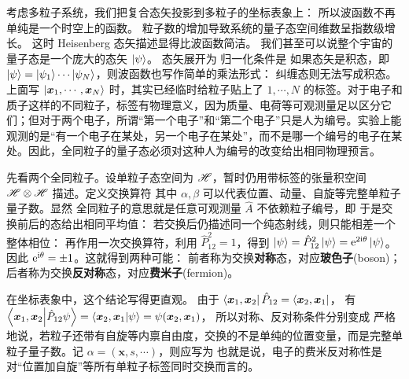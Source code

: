 考虑多粒子系统，我们把复合态矢投影到多粒子的坐标表象上：
所以波函数不再单纯是一个时空上的函数。
粒子数的增加导致系统的量子态空间维数呈指数级增长。
这时 Heisenberg 态矢描述显得比波函数简洁。
我们甚至可以说整个宇宙的量子态是一个庞大的态矢 $\ket{\psi}$。
态矢展开为
归一化条件是
如果态矢是积态，即 $\ket{\psi}=\ket{\psi_1}\cdots\ket{\psi_N}$，则波函数也写作简单的乘法形式：
纠缠态则无法写成积态。
上面写 $\ket{\bm x_1,\cdots,\bm x_N}$ 时，其实已经临时给粒子贴上了 $1,\cdots,N$ 的标签。对于电子和质子这样的不同粒子，标签有物理意义，因为质量、电荷等可观测量足以区分它们；但对于两个电子，所谓“第一个电子”和“第二个电子”只是人为编号。实验上能观测的是“有一个电子在某处，另一个电子在某处”，而不是哪一个编号的电子在某处。因此，全同粒子的量子态必须对这种人为编号的改变给出相同物理预言。

先看两个全同粒子。设单粒子态空间为 $\mathscr{H}$，暂时仍用带标签的张量积空间 $\mathscr{H}\otimes\mathscr{H}$ 描述。定义交换算符
其中 $\alpha,\beta$ 可以代表位置、动量、自旋等完整单粒子量子数。显然
全同粒子的意思就是任意可观测量 $\hat A$ 不依赖粒子编号，即
于是交换前后的态给出相同平均值：
若交换后仍描述同一个纯态射线，则只能相差一个整体相位：
再作用一次交换算符，利用 $\hat P_{12}^2=1$，得到 $\ket{\psi}=\hat P_{12}^2\ket{\psi}=\mathrm{e}^{2\mathrm{i}\theta}\ket{\psi}$。
因此 $\mathrm{e}^{\mathrm{i}\theta}=\pm 1$。这就得到两种可能：
前者称为交换\textbf{对称}态，对应\textbf{玻色子}(boson)；后者称为交换\textbf{反对称}态，对应\textbf{费米子}(fermion)。

在坐标表象中，这个结论写得更直观。
由于 $\bra{\bm x_1,\bm x_2}\hat P_{12}=\bra{\bm x_2,\bm x_1}$，
有 $\ip{\bm x_1,\bm x_2}{\hat P_{12}\psi}=\ip{\bm x_2,\bm x_1}{\psi}=\psi(\bm x_2,\bm x_1)$，
所以对称、反对称条件分别变成
严格地说，若粒子还带有自旋等内禀自由度，交换的不是单纯的位置变量，而是完整单粒子量子数。记 $\alpha=(\bm x,s,\cdots)$，则应写为
也就是说，电子的费米反对称性是对“位置加自旋”等所有单粒子标签同时交换而言的。


